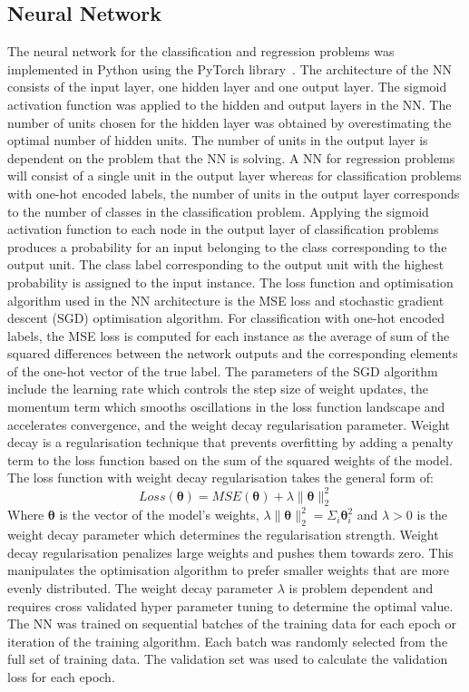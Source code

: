 \documentclass[conference]{IEEEtran}
\begin{document}
	\subsection{Neural Network}
	The neural network for the classification and regression problems was implemented in Python using the PyTorch library~\cite{paszke2019pytorch}. The architecture of the NN consists of the input layer, one hidden layer and one output layer. The sigmoid activation function was applied to the hidden and output layers in the NN. The number of units chosen for the hidden layer was obtained by overestimating the optimal number of hidden units. The number of units in the output layer is dependent on the problem that the NN is solving. A NN for regression problems will consist of a single unit in the output layer whereas for classification problems with one-hot encoded labels, the number of units in the output layer corresponds to the number of classes in the classification problem. Applying the sigmoid activation function to each node in the output layer of classification problems produces a probability for an input belonging to the class corresponding to the output unit. The class label corresponding to the output unit with the highest probability is assigned to the input instance. The loss function and optimisation algorithm used in the NN architecture is the MSE loss and stochastic gradient descent (SGD) optimisation algorithm. For classification with one-hot encoded labels, the MSE loss is computed for each instance as the average of sum of the squared differences between the network outputs and the corresponding elements of the one-hot vector of the true label. The parameters of the SGD algorithm include the learning rate which controls the step size of weight updates, the momentum term which smooths oscillations in the loss function landscape and accelerates convergence, and the weight decay regularisation parameter. Weight decay is a regularisation technique that prevents overfitting by adding a penalty term to the loss function based on the sum of the squared weights of the model. The loss function with weight decay regularisation takes the general form of:
	$$
	Loss(\boldsymbol{\theta}) = MSE(\boldsymbol{\theta}) + \lambda\lVert\boldsymbol{\theta}\lVert_2^2
	$$
	Where $\boldsymbol{\theta}$ is the vector of the model's weights, $\lambda\lVert\boldsymbol{\theta}\lVert_2^2=\Sigma_{i}\boldsymbol{\theta}_i^2$ and $\lambda > 0$ is the weight decay parameter which determines the regularisation strength. Weight decay regularisation penalizes large weights and pushes them towards zero. This manipulates the optimisation algorithm to prefer smaller weights that are more evenly distributed. The weight decay parameter $\lambda$ is problem dependent and requires cross validated hyper parameter tuning to determine the optimal value. The NN was trained on sequential batches of the training data for each epoch or iteration of the training algorithm. Each batch was randomly selected from the full set of training data. The validation set was used to calculate the validation loss for each epoch. 
	
\end{document}
